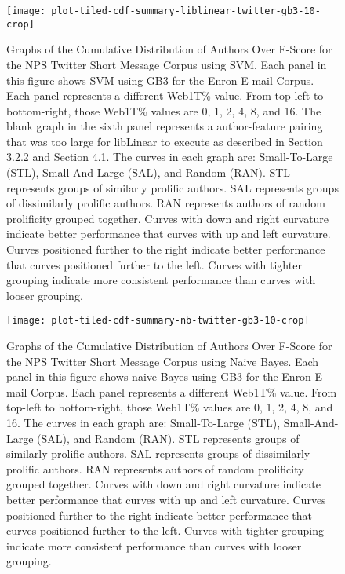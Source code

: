 	\begin{figure}[htbp!]
		\begin{center}
		\centering
		\texttt{[image: plot-tiled-cdf-summary-liblinear-twitter-gb3-10-crop]}
		\caption{Graphs of the Cumulative Distribution of Authors Over F-Score for the NPS Twitter Short Message Corpus using SVM. Each panel in this figure shows SVM using GB3 for the Enron E-mail Corpus.  Each panel represents a different Web1T\% value.  From top-left to bottom-right, those Web1T\% values are 0, 1, 2, 4, 8, and 16.  The blank graph in the sixth panel represents a author-feature pairing that was too large for libLinear to execute as described in Section 3.2.2 and Section 4.1.  The curves in each graph are: Small-To-Large (STL), Small-And-Large (SAL), and Random (RAN).  STL represents groups of similarly prolific authors.  SAL represents groups of dissimilarly prolific authors.  RAN represents authors of random prolificity grouped together.  Curves with down and right curvature indicate better performance that curves with up and left curvature.  Curves positioned further to the right indicate better performance that curves positioned further to the left.  Curves with tighter grouping indicate more consistent performance than curves with looser grouping.}
		\label{fig:plot-tiled-cdf-summary-liblinear-twitter-gb3-10}
		\end{center}
	\end{figure}
	
	\begin{figure}[htbp!]
		\begin{center}
		\centering
		\texttt{[image: plot-tiled-cdf-summary-nb-twitter-gb3-10-crop]}
		\caption{Graphs of the Cumulative Distribution of Authors Over F-Score for the NPS Twitter Short Message Corpus using Naive Bayes. Each panel in this figure shows naive Bayes using GB3 for the Enron E-mail Corpus.  Each panel represents a different Web1T\% value.  From top-left to bottom-right, those Web1T\% values are 0, 1, 2, 4, 8, and 16.  The curves in each graph are: Small-To-Large (STL), Small-And-Large (SAL), and Random (RAN).  STL represents groups of similarly prolific authors.  SAL represents groups of dissimilarly prolific authors.  RAN represents authors of random prolificity grouped together.  Curves with down and right curvature indicate better performance that curves with up and left curvature.  Curves positioned further to the right indicate better performance that curves positioned further to the left.  Curves with tighter grouping indicate more consistent performance than curves with looser grouping.}
		\label{fig:plot-tiled-cdf-summary-nb-twitter-gb3-10}
		\end{center}
	\end{figure}
	
